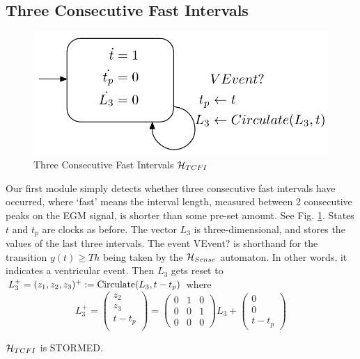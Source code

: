 \subsection{Three Consecutive Fast Intervals}
\label{sec:tcfi}
\begin{figure}[t]
	\centering
	\includegraphics[scale=0.3]{figures/TCFI}
		\vspace{-10pt}
	\caption{Three Consecutive Fast Intervals $\mathcal{H}_{TCFI}$}
	\label{fig:tcfi}
\end{figure}
Our first module simply detects whether three consecutive fast intervals have occurred, where `fast' means the interval length, measured between 2 consecutive peaks on the \ac{EGM} signal, is shorter than some pre-set amount.
See Fig. \ref{fig:tcfi}.
States $t$ and $t_p$ are clocks as before.
The vector $L_3$ is three-dimensional, and stores the values of the last three intervals.
The event VEvent? is shorthand for the transition $y(t) \geq Th$ being taken by the $\mathcal{H}_{Sense}$ automaton.
In other words, it indicates a ventricular event.
Then $L_3$ gets reset to $L_3^+ = (z_1,z_2,z_3)^+ := \text{Circulate}(L_3,t-t_p)$ where
\begin{equation}
L_3^+ = 
\left(\begin{matrix}
z_2\\z_3\\t-t_{p}\\
\end{matrix}
\right)
=
\left(\begin{matrix}
0 & 1 & 0\\0& 0& 1\\0& 0 &0
\end{matrix}
\right) L_3 + 
\left(\begin{matrix}
0\\0\\t-t_p
\end{matrix}
\right)
\end{equation}
%
\begin{lemma}
	$\mathcal{H}_{TCFI}$ is STORMED.
\end{lemma}
